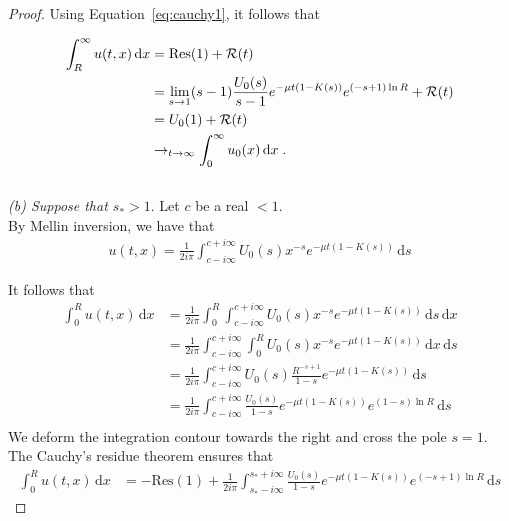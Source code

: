 \documentclass[11pt]{amsart}
\newcommand{\diff}{\,\mathrm{d}}
\begin{document}
\begin{proof}
            Using Equation~\ref{eq:cauchy1}, it follows that 
            
            \begin{align*}
                \int_R^\infty u(t,x) \diff x &= \mathrm{Res(1)} + \Rcal(t) \\
                &= \lim_{s \to 1} (s-1)\frac{U_0(s)}{s-1} e^{-\mu t(1 - K(s))} e^{(-s+1)\ln R}  + \Rcal(t)\\
                &= U_0(1) + \Rcal(t)\\
                &\to_{t \to \infty} \int_0^\infty u_0(x) \diff x
                \eqfinp
            \end{align*}\\
            
            \textit{(b) Suppose that $s_* > 1$}. Let $c$ be a real $<1$. \\
            By Mellin inversion, we have that
            \begin{align*}
                u(t,x) = \frac{1}{2i\pi}\int_{c-i\infty}^{c+i\infty} U_0(s) x^{-s} e^{-\mu t(1 - K(s))} \diff s
            \end{align*}
            
            It follows that
            \begin{align*}
                \int_0^R u(t,x) \diff x 
                &= \frac{1}{2i\pi} \int_0^R \int_{c-i\infty}^{c+i\infty} U_0(s) x^{-s} e^{-\mu t(1 - K(s))} \diff s \diff x \\
                &= \frac{1}{2i\pi} \int_{c-i\infty}^{c+i\infty} \int_0^R U_0(s) x^{-s} e^{-\mu t(1 - K(s))} \diff x \diff s \\
                &= \frac{1}{2i\pi} \int_{c-i\infty}^{c+i\infty} U_0(s) \frac{R^{-s+1}}{1-s} e^{-\mu t(1 - K(s))} \diff s \\
                &= \frac{1}{2i\pi} \int_{c-i\infty}^{c+i\infty} \frac{U_0(s)}{1-s} e^{-\mu t(1 - K(s))} e^{(1-s)\ln R} \diff s \\
            \end{align*}
            We deform the integration contour towards the right and cross the pole $s = 1$. The Cauchy's residue theorem ensures that
            \begin{align}
                \int_0^R u(t,x) \diff x &= -\mathrm{Res(1)} + \frac{1}{2i\pi} \int_{s_*-i\infty}^{s_*+i\infty} \frac{U_0(s)}{1-s} e^{-\mu t(1 - K(s))} e^{(-s+1)\ln R} \diff s
                \label{eq:cauchy3}
            \end{align}
            

\end{proof}
\end{document}
